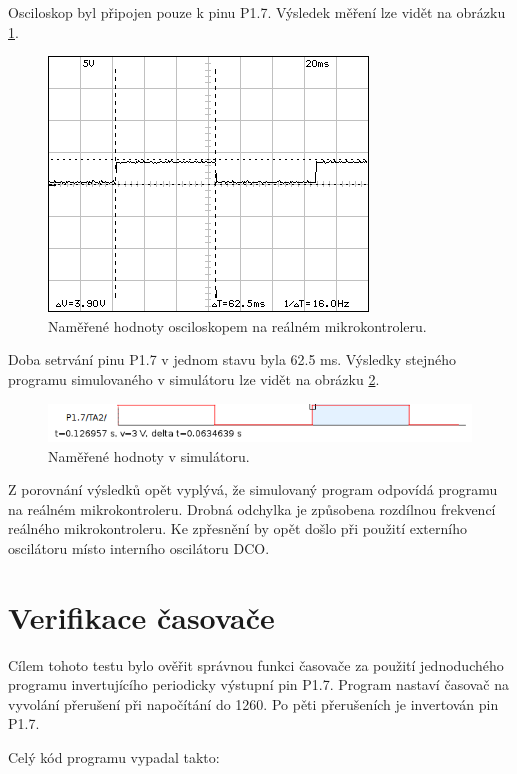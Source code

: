 Osciloskop byl připojen pouze k pinu P1.7. Výsledek měření lze vidět na obrázku \ref{fig:dso05osc}.

\begin{figure}[ht]
\centering
\includegraphics[trim=0cm 0cm 0cm 0cm]{fig/dso05}
\caption{Naměřené hodnoty osciloskopem na reálném mikrokontroleru.}
\label{fig:dso05osc}
\end{figure}

Doba setrvání pinu P1.7 v jednom stavu byla 62.5 ms. Výsledky stejného programu simulovaného v simulátoru lze vidět na obrázku \ref{fig:dso05sim}.

\begin{figure}[ht]
\centering
\includegraphics[trim=0cm 0cm 0cm 0cm, scale=0.8]{fig/dso05sim}
\caption{Naměřené hodnoty v simulátoru.}
\label{fig:dso05sim}
\end{figure}

Z porovnání výsledků opět vyplývá, že simulovaný program odpovídá programu na reálném mikrokontroleru. Drobná odchylka je způsobena rozdílnou frekvencí reálného mikrokontroleru. Ke zpřesnění by opět došlo při použití externího oscilátoru místo interního oscilátoru DCO.

\section{Verifikace časovače}

Cílem tohoto testu bylo ověřit správnou funkci časovače za použití jednoduchého programu invertujícího periodicky výstupní pin P1.7. Program nastaví časovač na vyvolání přerušení při napočítání do 1260. Po pěti přerušeních je invertován pin P1.7.

Celý kód programu vypadal takto:

